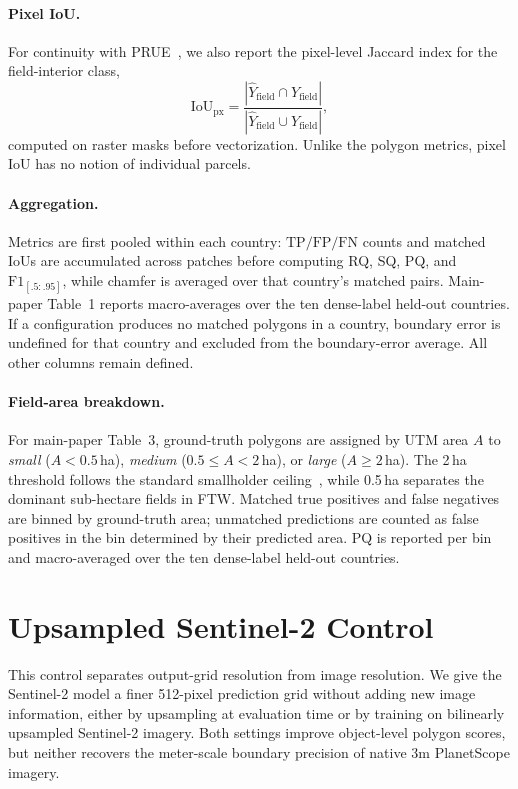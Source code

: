 \documentclass[10pt,twocolumn,letterpaper]{article}
\begin{document}
\paragraph{Pixel IoU.}
For continuity with PRUE~\cite{muhawenayo2026prue}, we also report the pixel-level Jaccard index for the field-interior class,
\begin{equation}
\mathrm{IoU}_{\mathrm{px}} =
\frac{|\hat{Y}_{\mathrm{field}}\cap Y_{\mathrm{field}}|}
{|\hat{Y}_{\mathrm{field}}\cup Y_{\mathrm{field}}|},
\end{equation}
computed on raster masks before vectorization. Unlike the polygon metrics, pixel IoU has no notion of individual parcels.

\paragraph{Aggregation.}
Metrics are first pooled within each country: $\mathrm{TP}/\mathrm{FP}/\mathrm{FN}$ counts and matched IoUs are accumulated across patches before computing RQ, SQ, PQ, and $\mathrm{F1}_{[.5:.95]}$, while chamfer is averaged over that country's matched pairs. Main-paper Table~1 reports macro-averages over the ten dense-label held-out countries. If a configuration produces no matched polygons in a country, boundary error is undefined for that country and excluded from the boundary-error average. All other columns remain defined.

\paragraph{Field-area breakdown.}
For main-paper Table~3, ground-truth polygons are assigned by UTM area $A$ to \emph{small} ($A<0.5$\,ha), \emph{medium} ($0.5\le A<2$\,ha), or \emph{large} ($A\ge2$\,ha). The 2\,ha threshold follows the standard smallholder ceiling~\cite{lowder2016farms}, while 0.5\,ha separates the dominant sub-hectare fields in FTW. Matched true positives and false negatives are binned by ground-truth area; unmatched predictions are counted as false positives in the bin determined by their predicted area. PQ is reported per bin and macro-averaged over the ten dense-label held-out countries.


\section{Upsampled Sentinel-2 Control}
\label{app:upsampled_s2}

This control separates output-grid resolution from image resolution. We give the Sentinel-2 model a finer 512-pixel prediction grid without adding new image information, either by upsampling at evaluation time or by training on bilinearly upsampled Sentinel-2 imagery. Both settings improve object-level polygon scores, but neither recovers the meter-scale boundary precision of native 3m PlanetScope imagery.
\end{document}
